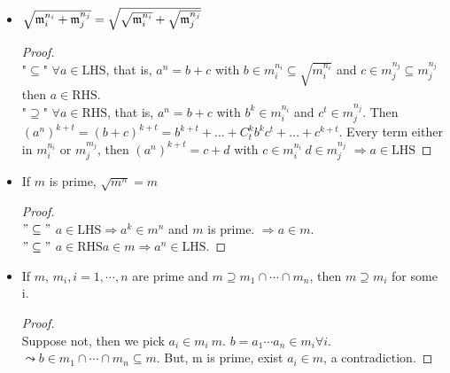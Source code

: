 \begin{prop} \leavevmode \label{prop:radical-power-relation} 
  \begin{itemize}
    \item  $\sqrt{\mathfrak{m}_i^{n_i} + \mathfrak{m}_j^{n_j}} = \sqrt{\sqrt{\mathfrak{m}_i^{n_i}} + 
      \sqrt{\mathfrak{m}_j^{n_j}}}$
      \begin{proof} $ $\\ 
        "$\subseteq$" $\forall a \in \text{LHS}$, that is, $a^n  = b + c$ with 
        $b \in m_i^{n_i} \subseteq \sqrt{m_i^{n_i}}$ and 
        $c \in m_j^{n_j} \subseteq{m_j^{n_j}}$ then $a \in \text{RHS}$. \\
        "$\supseteq$" $\forall a \in \text{RHS}$, that is, $a^n = b + c$ with 
        $b^k \in m_i^{n_i}$ and $c^t \in m_j^{n_j}$. Then 
        $(a^n)^{k+t} = (b + c)^{k + t} = b^{k+t} + \dots + C_{t}^{k}b^kc^t
        + \dots + c^{k+t}$. Every term either in $m_i^{n_i}$ or $m_j^{m_j}$,
         then $(a^n)^{k+t} = c + d$ with $c \in m_i^{n_i}\ d \in m_j^{n_j}$
         $\Rightarrow a \in \text{LHS}$
      \end{proof}
    \item If $m$ is prime, $\sqrt{m^{n}} = m$
      \begin{proof} $ $\\
        $"\subseteq"$ $a \in \text{LHS} \Rightarrow a^k \in m^{n}$ and $m$ is prime.
        $\Rightarrow a \in m$. \\
        $"\subseteq"$ $a \in \text{RHS} a \in m \Rightarrow a^n \in \text{LHS}$.
      \end{proof}
     \item If $m$, $m_i, i = 1, \cdots, n$ are prime and $m \supseteq m_1 \cap
       \cdots \cap m_n$, then $m \supseteq m_i$ for some i.
       \begin{proof} $ $\\
         Suppose not, then we pick $a_i \in m_i \ m$. $b = a_1\cdots a_n \in m_i 
         \forall i$. $\leadsto b \in m_1 \cap \cdots \cap m_n \subseteq m$. But,
         m is prime, exist $a_i \in m$, a contradiction. 
       \end{proof}
  \end{itemize}
\end{prop}


